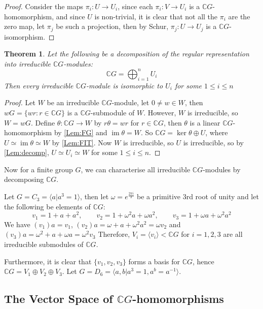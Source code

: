 \documentclass[11pt, notitlepage]{article}
\numberwithin{equation}{section}
\theoremstyle{plain}
\newtheorem{theorem}{Theorem}[section]
\theoremstyle{definition}
\newenvironment{example}
	{\pushQED{\qed}\renewcommand{\qedsymbol}{$\blacktriangleleft$}\examplex}
	{\popQED\endexamplex}
\newcommand{\CG}{{\mathbb{C}G}}
\DeclareMathOperator{\im}{im}
\begin{document}
\begin{proof}
	Consider the maps $\pi_i:U\rightarrow U_i$, since each $\pi_i:V\rightarrow U_i$ is a $\CG$-homomorphism, and since $U$ is non-trivial, it is clear that not all the $\pi_i$ are the zero map, let $\pi_j$ be such a projection, then by Schur, $\pi_j:U\rightarrow U_j$ is a $\CG$-isomorphism.
\end{proof}
\begin{theorem}
	Let the following be a decomposition of the regular representation into irreducible $\CG$-modules:
	\[
	\CG = \bigoplus_{i = 1}^n U_i
	\]
	Then every irreducible $\CG$-module is isomorphic to $U_i$ for some $1\leq i\leq n$
\end{theorem}
\begin{proof}
	Let $W$ be an irreducible $\CG$-module, let $0\neq w\in W$, then $wG = \{wr:r\in \CG\}$ is a $\CG$-submodule of $W$. However, $W$ is irreducible, so $W=wG$. Define $\theta:\CG\rightarrow W$ by $r\theta = wr$ for $r\in \CG$, then $\theta$ is a linear $\CG$-homomorphism by \ref{Lem:FG} and $\im\theta=W$. So $\CG = \ker\theta\oplus U$, where $U\simeq \im \theta\simeq W$ by \ref{Lem:FIT}. Now $W$ is irreducible, so $U$ is irreducible, so by \ref{Lem:decomp}, $U\simeq U_i\simeq W$ for some $1\leq i\leq n$.
\end{proof}

Now for a finite group $G$, we can characterise all irreducible $\CG$-modules by decomposing $\CG$.

\begin{example}
	Let $G = C_3 = \langle a|a^3=1\rangle$, then let $\omega = e^{\frac{2\pi i}{3}}$ be a primitive 3rd root of unity and let the following be elements of $\CG$:
	\[
	v_1 = 1+a+a^2,\qquad v_2 = 1+\omega^2 a+\omega a^2,\qquad v_3 = 1+\omega a +\omega^2 a^2
	\]
	We have $(v_1)a = v_1$, $(v_2)a = \omega+a+\omega^2a^2=\omega v_2$ and $(v_3)a = \omega^2+a+\omega a = \omega^2v_3$
	Therefore, $V_i = \langle v_i\rangle<\CG$ for $i=1,2,3$ are all irreducible submodules of $\CG$.
	
	Furthermore, it is clear that $\{v_1,v_2,v_3\}$ forms a basis for $\CG$, hence $\CG=V_1\oplus V_2\oplus V_3$.
\end{example}
\begin{example}
	Let $G = D_6 = \langle a,b|a^3=1,a^b=a^{-1}\rangle$.
\end{example}
\subsection{The Vector Space of $\CG$-homomorphisms}
\end{document}
